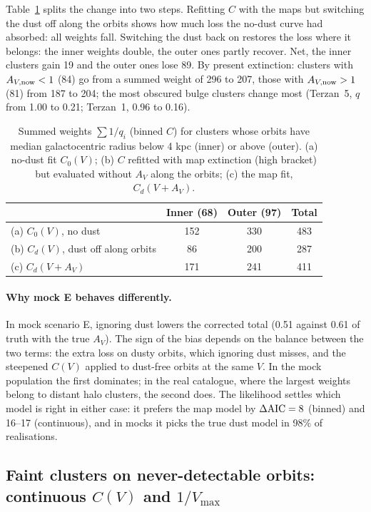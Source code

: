 \documentclass[11pt,a4paper]{article}
\begin{document}
Table~\ref{tab:nodust} splits the change into two steps. Refitting $C$ with the maps but switching
the dust off along the orbits shows how much loss the no-dust curve had absorbed: all weights fall.
Switching the dust back on restores the loss where it belongs: the inner weights double, the outer
ones partly recover. Net, the inner clusters gain 19 and the outer ones lose 89. By present
extinction: clusters with $A_{V,\rm now}<1$ (84) go from a summed weight of 296 to 207, those with
$A_{V,\rm now}>1$ (81) from 187 to 204; the most obscured bulge clusters change most (Terzan~5, $q$
from 1.00 to 0.21; Terzan~1, 0.96 to 0.16).

\begin{table}[h]
\centering
\caption{Summed weights $\sum 1/q_i$ (binned $C$) for clusters whose orbits have median galactocentric
radius below 4 kpc (inner) or above (outer). (a) no-dust fit $C_0(V)$; (b) $C$ refitted with map
extinction (high bracket) but evaluated without $A_V$ along the orbits; (c) the map fit, $C_d(V+A_V)$.}
\label{tab:nodust}
\small
\begin{tabular}{lccc}
\toprule
 & Inner (68) & Outer (97) & Total \\
\midrule
(a) $C_0(V)$, no dust & 152 & 330 & 483 \\
(b) $C_d(V)$, dust off along orbits & 86 & 200 & 287 \\
(c) $C_d(V+A_V)$ & 171 & 241 & 411 \\
\bottomrule
\end{tabular}
\end{table}

\paragraph{Why mock E behaves differently.} In mock scenario E, ignoring dust lowers the corrected total
(0.51 against 0.61 of truth with the true $A_V$). The sign of the bias depends on the balance between
the two terms: the extra loss on dusty orbits, which ignoring dust misses, and the steepened $C(V)$
applied to dust-free orbits at the same $V$. In the mock population the first dominates; in the real
catalogue, where the largest weights belong to distant halo clusters, the second does. The
likelihood settles which model is right in either case: it prefers the map model by $\Delta{\rm AIC}
= 8$ (binned) and 16--17 (continuous), and in mocks it picks the true dust model in 98\% of realisations.

\subsection{Faint clusters on never-detectable orbits: continuous $C(V)$ and $1/V_{\max}$}
\label{sec:vmax}
\end{document}
